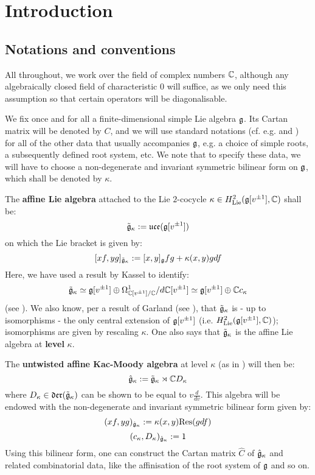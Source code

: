 \section{Introduction}
    \subsection{Notations and conventions}
        All throughout, we work over the field of complex numbers $\mathbb{C}$, although any algebraically closed field of characteristic $0$ will suffice, as we only need this assumption so that certain operators will be diagonalisable. 

        We fix once and for all a finite-dimensional simple Lie algebra $\mathfrak{g}$. Its Cartan matrix will be denoted by $C$, and we will use standard notations (cf. e.g. \cite{humphreys_lie_algebras} and \cite{kac_infinite_dimensional_lie_algebras}) for all of the other data that usually accompanies $\mathfrak{g}$, e.g. a choice of simple roots, a subsequently defined root system, etc. We note that to specify these data, we will have to choose a non-degenerate and invariant symmetric bilinear form on $\mathfrak{g}$, which shall be denoted by $\kappa$.

        The \textbf{affine Lie algebra} attached to the Lie $2$-cocycle $\kappa \in H^2_{\mathrm{Lie}}(\mathfrak{g}[v^{\pm 1}], \mathbb{C})$ shall be:
            $$\tilde{\mathfrak{g}}_{\kappa} := \mathfrak{uce}(\mathfrak{g}[v^{\pm 1}])$$
        on which the Lie bracket is given by:
            $$[xf, yg]_{\tilde{\mathfrak{g}}_{\kappa}} := [x, y]_{\mathfrak{g}} fg + \kappa(x, y) g df$$
        Here, we have used a result by Kassel to identify:
            $$\tilde{\mathfrak{g}}_{\kappa} \simeq \mathfrak{g}[v^{\pm 1}] \oplus \Omega^1_{\mathbb{C}[v^{\pm 1}]/\mathbb{C}}/d\mathbb{C}[v^{\pm 1}] \simeq \mathfrak{g}[v^{\pm 1}] \oplus \mathbb{C} c_{\kappa}$$
        (see \cite{kassel_universal_central_extensions_of_lie_algebras}). We also know, per a result of Garland (see \cite{garland_arithmetics_of_loop_groups}), that $\tilde{\mathfrak{g}}_{\kappa}$ is - up to isomorphisms - the only central extension of $\mathfrak{g}[v^{\pm 1}]$ (i.e. $H^2_{\mathrm{Lie}}(\mathfrak{g}[v^{\pm 1}], \mathbb{C})$); isomorphisms are given by rescaling $\kappa$. One also says that $\tilde{\mathfrak{g}}_{\kappa}$ is the affine Lie algebra at \textbf{level} $\kappa$.

        The \textbf{untwisted affine Kac-Moody algebra} at level $\kappa$ (as in \cite[Chapter 7]{kac_infinite_dimensional_lie_algebras}) will then be:
            $$\hat{\mathfrak{g}}_{\kappa} := \tilde{\mathfrak{g}}_{\kappa} \rtimes \mathbb{C} D_{\kappa}$$
        where $D_{\kappa} \in \mathfrak{der}(\tilde{\mathfrak{g}}_{\kappa})$ can be shown to be equal to $v\frac{d}{dv}$. This algebra will be endowed with the non-degenerate and invariant symmetric bilinear form given by:
            $$(xf, yg)_{\hat{\mathfrak{g}}_{\kappa}} := \kappa(x, y) \mathrm{Res}(g df)$$
            $$(c_{\kappa}, D_{\kappa})_{\hat{\mathfrak{g}}_{\kappa}} := 1$$
        Using this bilinear form, one can construct the Cartan matrix $\hat{C}$ of $\hat{\mathfrak{g}}_{\kappa}$ and related combinatorial data, like the affinisation of the root system of $\mathfrak{g}$ and so on.
            
